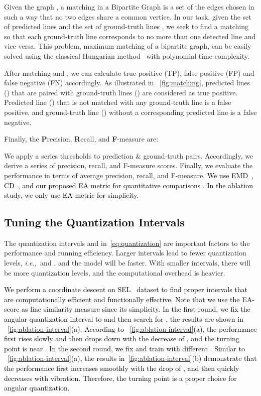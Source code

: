 \documentclass[10pt,journal,cspaper,compsoc]{IEEEtran}
\newcommand{\revise}[1]{{\textcolor{black}{#1}}}
\newcommand{\rerevise}[1]{{\textcolor{black}{#1}}}
\def\ie{\emph{i.e.,~}}
\begin{document}
Given the graph , a matching in a Bipartite Graph is a set of the edges chosen in such a way that no two edges share
a common vertice.
In our task, given the set of predicted lines  and the set of
ground-truth lines , we seek to find a matching so that
each ground-truth line  corresponds to no more than one detected line 
and vice versa.
This problem, maximum matching of a bipartite graph, can be easily solved using the
classical Hungarian method~\cite{kuhn1955hungarian} with polynomial time complexity.

After matching  and , we can calculate true positive
(TP), false positive (FP) and false negative (FN) accordingly.
As illustrated in ~\cref{fig:matching}, predicted lines () that are paired with
ground-truth lines () are considered as true positive.
Predicted line () that is not matched with any ground-truth line is
a false positive,
and ground-truth line () without a corresponding predicted line
is a false negative.

Finally, the \textbf{P}recision, \textbf{R}ecall, and \textbf{F}-measure are:

We apply a series thresholds  to prediction \& ground-truth pairs.
Accordingly, we derive a series of precision, recall, and F-measure scores.
Finally, we evaluate the performance in terms of average precision, recall, and
F-measure. \rerevise{We use EMD~\cite{rubner2000earth}, CD~\cite{borgefors1986distance}, and our proposed EA metric
for quantitative comparisons .
In the ablation study, we only use EA metric for simplicity.}

\subsection{\revise{Tuning the Quantization Intervals}}\label{sec:quant-intervals}
The quantization intervals  and  in~\cref{eq:quantization}
are important factors to the performance and running efficiency.
Larger intervals lead to fewer quantization levels, \ie  and ,
and the model will be faster.
With smaller intervals, there will be more quantization levels,
and the computational overhead is heavier.

\revise{We perform a coordinate descent on SEL~\cite{lee2017semantic} dataset
to find proper intervals that are computationally efficient and functionally
effective.
Note that we use the EA-score as line similarity measure since its simplicity.
In the first round, we fix the angular quantization interval to 
and then search for ,
the results are shown in ~\cref{fig:ablation-interval}(a).
According to ~\cref{fig:ablation-interval}(a),
the performance first rises slowly and then drops down with the decrease of ,
and the turning point is near .
In the second round, we fix  and train with different .
Similar to ~\cref{fig:ablation-interval}(a),
the results in~\cref{fig:ablation-interval}(b) demonstrate that
the performance first increases smoothly with the drop of ,
and then quickly decreases with vibration.
Therefore, the turning point  is a proper choice for angular quantization.}
\end{document}
